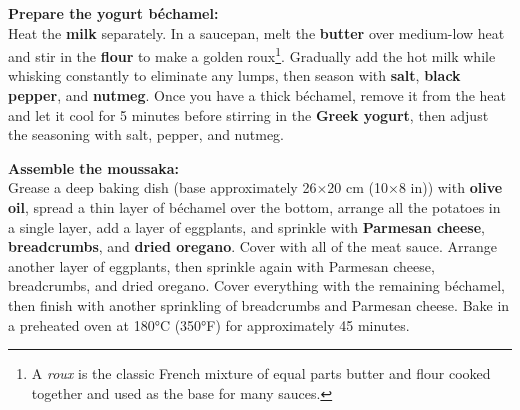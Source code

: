 \textbf{Prepare the yogurt béchamel:} \\
Heat the \textbf{milk} separately.
In a saucepan, melt the \textbf{butter} over medium-low heat and stir in the \textbf{flour} to make a golden roux\footnote{A \textit{roux} is the classic French mixture of equal parts butter and flour cooked together and used as the base for many sauces.}.
Gradually add the hot milk while whisking constantly to eliminate any lumps, then season with \textbf{salt}, \textbf{black pepper}, and \textbf{nutmeg}.
Once you have a thick béchamel, remove it from the heat and let it cool for 5 minutes before stirring in the \textbf{Greek yogurt}, then adjust the seasoning with salt, pepper, and nutmeg.

\textbf{Assemble the moussaka:} \\
Grease a deep baking dish (base approximately 26$\times$20 cm (10$\times$8 in)) with \textbf{olive oil}, spread a thin layer of béchamel over the bottom, arrange all the potatoes in a single layer, add a layer of eggplants, and sprinkle with \textbf{Parmesan cheese}, \textbf{breadcrumbs}, and \textbf{dried oregano}.
Cover with all of the meat sauce.
Arrange another layer of eggplants, then sprinkle again with Parmesan cheese, breadcrumbs, and dried oregano.
Cover everything with the remaining béchamel, then finish with another sprinkling of breadcrumbs and Parmesan cheese.
Bake in a preheated oven at 180°C (350°F) for approximately 45 minutes.

\begin{recipeblock}
	
\end{recipeblock}